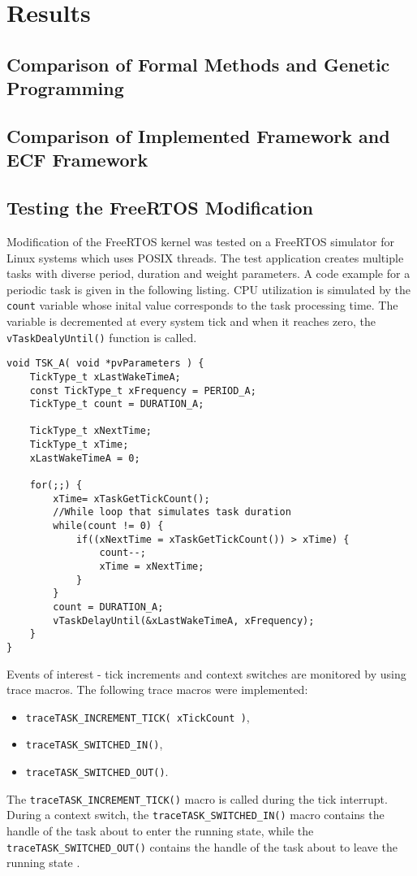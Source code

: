 \chapter{Results}
\section{Comparison of Formal Methods and Genetic Programming}
\section{Comparison of Implemented Framework and ECF Framework}
\section{Testing the FreeRTOS Modification}
Modification of the FreeRTOS kernel was tested on a FreeRTOS simulator for Linux systems which uses POSIX threads.
The test application creates multiple tasks with diverse period, duration and weight parameters. 
A code example for a periodic task is given in the following listing.
CPU utilization is simulated by the \verb$count$ variable whose inital value corresponds to the task processing time. 
The variable is decremented at every system tick and when it reaches zero, the \verb$vTaskDealyUntil()$ function is called. 
\begin{lstlisting}[frame=none, label={switchcontext}, caption={Task function simulating a periodic task.}, captionpos=b]
void TSK_A( void *pvParameters ) {
    TickType_t xLastWakeTimeA;
    const TickType_t xFrequency = PERIOD_A;
    TickType_t count = DURATION_A;

    TickType_t xNextTime;
    TickType_t xTime;
    xLastWakeTimeA = 0;
    
    for(;;) {
        xTime= xTaskGetTickCount();
        //While loop that simulates task duration
        while(count != 0) {
            if((xNextTime = xTaskGetTickCount()) > xTime) {
                count--;
                xTime = xNextTime;
            }
        }
        count = DURATION_A;
        vTaskDelayUntil(&xLastWakeTimeA, xFrequency);
    }
}
\end{lstlisting}
Events of interest - tick increments and context switches are monitored by using trace macros. 
The following trace macros were implemented:
\begin{itemize}
	\item \verb$traceTASK_INCREMENT_TICK( xTickCount )$,
	\item \verb$traceTASK_SWITCHED_IN()$,
	\item \verb$traceTASK_SWITCHED_OUT()$.
\end{itemize}
The \verb$traceTASK_INCREMENT_TICK()$ macro is called during the tick interrupt.
During a context switch, the \verb$traceTASK_SWITCHED_IN()$ macro contains the handle of the task about to enter the running state, while the \verb$traceTASK_SWITCHED_OUT()$ contains the handle of the task about to leave the running state \cite{freertosref}. 

